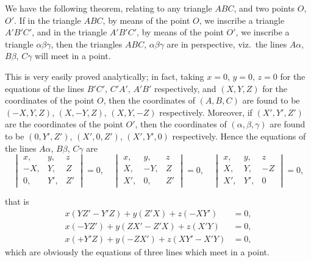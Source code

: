 \documentclass[11pt]{article}
\begin{document}
We have the following theorem, relating to any triangle $ABC$, and two points $O$, $O'$. If in the triangle $ABC$, by means of the point $O$, we inscribe a triangle $A'B'C'$, and in the triangle $A'B'C'$, by means of the point $O'$, we inscribe a triangle $\alpha\beta\gamma$, then the triangles $ABC$, $\alpha\beta\gamma$ are in perspective, viz.\ the lines $A\alpha$, $B\beta$, $C\gamma$ will meet in a point.

This is very easily proved analytically; in fact, taking $x=0$, $y=0$, $z=0$ for the equations of the lines $B'C'$, $C'A'$, $A'B'$ respectively, and $(X, Y, Z)$ for the coordinates of the point $O$, then the coordinates of $(A, B, C)$ are found to be $(-X, Y, Z)$, $(X, -Y, Z)$, $(X, Y, -Z)$ respectively. Moreover, if $(X', Y', Z')$ are the coordinates of the point $O'$, then the coordinates of $(\alpha, \beta, \gamma)$ are found to be $(0, Y', Z')$, $(X', 0, Z')$, $(X', Y', 0)$ respectively. Hence the equations of the lines $A\alpha$, $B\beta$, $C\gamma$ are
\[
\begin{vmatrix} x, & y, & z \\ -X, & Y, & Z \\ 0, & Y', & Z' \end{vmatrix} = 0,\quad
\begin{vmatrix} x, & y, & z \\ X, & -Y, & Z \\ X', & 0, & Z' \end{vmatrix} = 0,\quad
\begin{vmatrix} x, & y, & z \\ X, & Y, & -Z \\ X', & Y', & 0 \end{vmatrix} = 0,
\]

\newpage

\noindent that is
\begin{align*}
x(YZ' - Y'Z) + y(Z'X) + z(-XY') &= 0,\\
x(-YZ') + y(ZX' - Z'X) + z(X'Y) &= 0,\\
x(+Y'Z) + y(-ZX') + z(XY' - X'Y) &= 0,
\end{align*}
which are obviously the equations of three lines which meet in a point.
\end{document}
